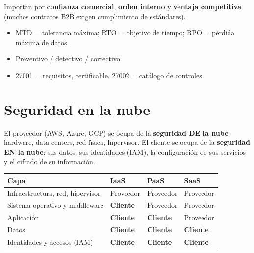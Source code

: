 \documentclass[12pt,a4paper]{article}
\begin{document}
Importan por \textbf{confianza comercial}, \textbf{orden interno} y \textbf{ventaja
competitiva} (muchos contratos B2B exigen cumplimiento de est\'andares).

\begin{cajaResumen}
\begin{itemize}
  \item MTD = tolerancia m\'axima; RTO = objetivo de tiempo; RPO = p\'erdida m\'axima de datos.
  \item Preventivo / detectivo / correctivo.
  \item 27001 = requisitos, certificable. 27002 = cat\'alogo de controles.
\end{itemize}
\end{cajaResumen}

\section{Seguridad en la nube}

\begin{cajaDefinicion}[title={Modelo de responsabilidad compartida}]
El proveedor (AWS, Azure, GCP) se ocupa de la \textbf{seguridad DE la nube}:
hardware, data centers, red f\'isica, hipervisor. El cliente se ocupa de la
\textbf{seguridad EN la nube}: sus datos, sus identidades (IAM), la configuraci\'on
de sus servicios y el cifrado de su informaci\'on.
\end{cajaDefinicion}

\begin{center}
\small
\begin{tabularx}{\linewidth}{|>{\raggedright\arraybackslash}p{3.6cm}|>{\centering\arraybackslash}X|>{\centering\arraybackslash}X|>{\centering\arraybackslash}X|}
\hline
\rowcolor{azulPrincipal!20}
\textbf{Capa} & \textbf{IaaS} & \textbf{PaaS} & \textbf{SaaS} \\
\hline
Infraestructura, red, hipervisor & \cellcolor{respProv}Proveedor & \cellcolor{respProv}Proveedor & \cellcolor{respProv}Proveedor \\
\hline
Sistema operativo y middleware & \cellcolor{respCli}\textbf{Cliente} & \cellcolor{respProv}Proveedor & \cellcolor{respProv}Proveedor \\
\hline
Aplicaci\'on & \cellcolor{respCli}\textbf{Cliente} & \cellcolor{respCli}\textbf{Cliente} & \cellcolor{respProv}Proveedor \\
\hline
Datos & \cellcolor{respCli}\textbf{Cliente} & \cellcolor{respCli}\textbf{Cliente} & \cellcolor{respCli}\textbf{Cliente} \\
\hline
Identidades y accesos (IAM) & \cellcolor{respCli}\textbf{Cliente} & \cellcolor{respCli}\textbf{Cliente} & \cellcolor{respCli}\textbf{Cliente} \\
\hline
\end{tabularx}
\end{center}
\end{document}
